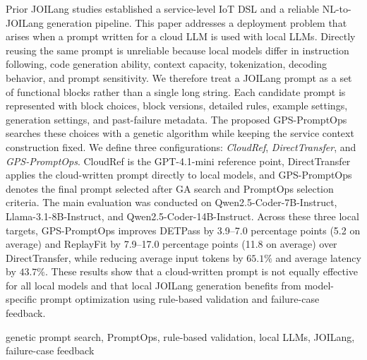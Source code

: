 \documentclass[10pt,twocolumn]{article}
\begin{document}
\begin{@twocolumnfalse}
\noindent{\bf [Abstract]}
Prior JOILang studies established a service-level IoT DSL and a reliable NL-to-JOILang generation pipeline. This paper addresses a deployment problem that arises when a prompt written for a cloud LLM is used with local LLMs. Directly reusing the same prompt is unreliable because local models differ in instruction following, code generation ability, context capacity, tokenization, decoding behavior, and prompt sensitivity. We therefore treat a JOILang prompt as a set of functional blocks rather than a single long string. Each candidate prompt is represented with block choices, block versions, detailed rules, example settings, generation settings, and past-failure metadata. The proposed GPS-PromptOps searches these choices with a genetic algorithm while keeping the service context construction fixed. We define three configurations: \emph{CloudRef}, \emph{DirectTransfer}, and \emph{GPS-PromptOps}. CloudRef is the GPT-4.1-mini reference point, DirectTransfer applies the cloud-written prompt directly to local models, and GPS-PromptOps denotes the final prompt selected after GA search and PromptOps selection criteria. The main evaluation was conducted on Qwen2.5-Coder-7B-Instruct, Llama-3.1-8B-Instruct, and Qwen2.5-Coder-14B-Instruct. Across these three local targets, GPS-PromptOps improves DETPass by 3.9--7.0 percentage points (5.2 on average) and ReplayFit by 7.9--17.0 percentage points (11.8 on average) over DirectTransfer, while reducing average input tokens by $65.1\%$ and average latency by $43.7\%$. These results show that a cloud-written prompt is not equally effective for all local models and that local JOILang generation benefits from model-specific prompt optimization using rule-based validation and failure-case feedback.


\vspace{0.25em}
 genetic prompt search, PromptOps, rule-based validation, local LLMs, JOILang, failure-case feedback

\vspace{0.55em}


\end{@twocolumnfalse}
\end{document}
